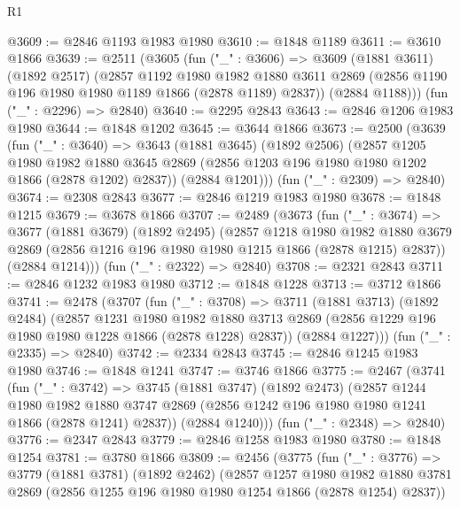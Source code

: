 \begin{lexlean}{R1}
\begin{coremodule}
@3609 := @2846 @1193 @1983 @1980
@3610 := @1848 @1189
@3611 := @3610 @1866
@3639 := @2511
    (@3605
      (fun ("_" : @3606) =>
      @3609
        (@1881 @3611)
        (@1892 @2517)
        (@2857
          @1192
          @1980
          @1982
          @1880
          @3611
          @2869
          (@2856 @1190 @196 @1980 @1980 @1189 @1866 (@2878 @1189) @2837))
        (@2884 @1188)))
    (fun ("_" : @2296) => @2840)
@3640 := @2295 @2843
@3643 := @2846 @1206 @1983 @1980
@3644 := @1848 @1202
@3645 := @3644 @1866
@3673 := @2500
    (@3639
      (fun ("_" : @3640) =>
      @3643
        (@1881 @3645)
        (@1892 @2506)
        (@2857
          @1205
          @1980
          @1982
          @1880
          @3645
          @2869
          (@2856 @1203 @196 @1980 @1980 @1202 @1866 (@2878 @1202) @2837))
        (@2884 @1201)))
    (fun ("_" : @2309) => @2840)
@3674 := @2308 @2843
@3677 := @2846 @1219 @1983 @1980
@3678 := @1848 @1215
@3679 := @3678 @1866
@3707 := @2489
    (@3673
      (fun ("_" : @3674) =>
      @3677
        (@1881 @3679)
        (@1892 @2495)
        (@2857
          @1218
          @1980
          @1982
          @1880
          @3679
          @2869
          (@2856 @1216 @196 @1980 @1980 @1215 @1866 (@2878 @1215) @2837))
        (@2884 @1214)))
    (fun ("_" : @2322) => @2840)
@3708 := @2321 @2843
@3711 := @2846 @1232 @1983 @1980
@3712 := @1848 @1228
@3713 := @3712 @1866
@3741 := @2478
    (@3707
      (fun ("_" : @3708) =>
      @3711
        (@1881 @3713)
        (@1892 @2484)
        (@2857
          @1231
          @1980
          @1982
          @1880
          @3713
          @2869
          (@2856 @1229 @196 @1980 @1980 @1228 @1866 (@2878 @1228) @2837))
        (@2884 @1227)))
    (fun ("_" : @2335) => @2840)
@3742 := @2334 @2843
@3745 := @2846 @1245 @1983 @1980
@3746 := @1848 @1241
@3747 := @3746 @1866
@3775 := @2467
    (@3741
      (fun ("_" : @3742) =>
      @3745
        (@1881 @3747)
        (@1892 @2473)
        (@2857
          @1244
          @1980
          @1982
          @1880
          @3747
          @2869
          (@2856 @1242 @196 @1980 @1980 @1241 @1866 (@2878 @1241) @2837))
        (@2884 @1240)))
    (fun ("_" : @2348) => @2840)
@3776 := @2347 @2843
@3779 := @2846 @1258 @1983 @1980
@3780 := @1848 @1254
@3781 := @3780 @1866
@3809 := @2456
    (@3775
      (fun ("_" : @3776) =>
      @3779
        (@1881 @3781)
        (@1892 @2462)
        (@2857
          @1257
          @1980
          @1982
          @1880
          @3781
          @2869
          (@2856 @1255 @196 @1980 @1980 @1254 @1866 (@2878 @1254) @2837))

\end{coremodule}
\end{lexlean}
